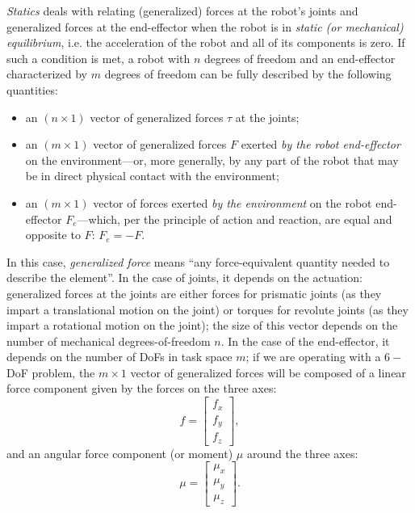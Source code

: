 \textsl{Statics} deals with relating (generalized) forces at the robot's joints and generalized forces at the end-effector when the robot is in \textsl{static (or mechanical) equilibrium}, i.e. the acceleration of the robot and all of its components is zero.
If such a condition is met, a robot with $n$ degrees of freedom and an end-effector characterized by $m$ degrees of freedom can be fully described by the following quantities:
\begin{itemize}
    \item an $\left( n \times 1 \right)$ vector of generalized forces $\tau$ at the joints;
    \item an $\left( m \times 1 \right)$ vector of generalized forces $F$ exerted \textsl{by the robot end-effector} on the environment---or, more generally, by any part of the robot that may be in direct physical contact with the environment;
    \item an $\left( m \times 1 \right)$ vector of forces exerted \textsl{by the environment} on the robot end-effector $F_e$---which, per the principle of action and reaction, are equal and opposite to $F$: $F_e=-F$.
\end{itemize}
In this case, \textsl{generalized force} means ``any force-equivalent quantity needed to describe the element''.
In the case of joints, it depends on the actuation: generalized forces at the joints are either forces for prismatic joints (as they impart a translational motion on the joint) or torques for revolute joints (as they impart a rotational motion on the joint); the size of this vector depends on the number of mechanical degrees-of-freedom $n$.
In the case of the end-effector, it depends on the number of DoFs in task space $m$; if we are operating with a $6-$DoF problem, the $m \times 1$ vector of generalized forces will be composed of a linear force component given by the forces on the three axes:
\begin{equation}
f=\left[\begin{array}{c}
f_x\\
f_y\\
f_z
\end{array}
\right],
\end{equation}
and an angular force component (or moment) $\mu$ around the three axes:
\begin{equation}
\mu=\left[\begin{array}{c}
\mu_x\\
\mu_y\\
\mu_z
\end{array}
\right].
\end{equation}
